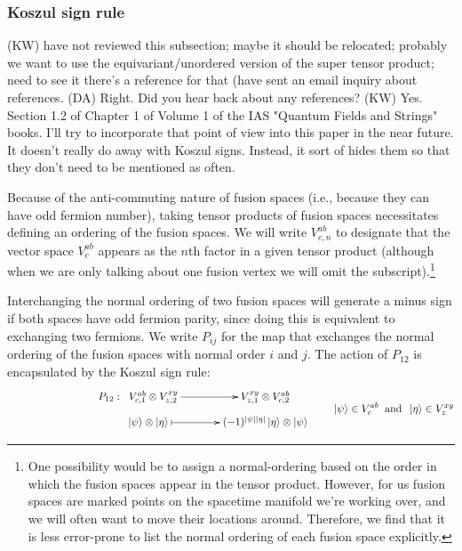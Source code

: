 \documentclass[12pt,a4paper]{article}
\newcommand{\tp}{\otimes}
\newcommand{\ket}[1]{\ensuremath{\left|#1\right\rangle}}
\newcommand{\dave}[1]{{\color{ao(english)}\footnotesize{(DA) #1}}}
\newcommand{\kw}[1]{{\color{kwcolor}\footnotesize{(KW) #1}}}
\begin{document}
\subsubsection{Koszul sign rule} \label{koszul_signs}

\kw{have not reviewed this subsection; maybe it should be relocated; 
probably we want to use the equivariant/unordered version of the super tensor product; 
need to see it there's a reference for that (have sent an email inquiry about references.}
\dave{Right. Did you hear back about any references?}
\kw{Yes.  Section 1.2 of Chapter 1 of Volume 1 of the IAS "Quantum Fields and Strings" books.
I'll try to incorporate that point of view into this paper in the near future.
It doesn't really do away with Koszul signs.
Instead, it sort of hides them so that they don't need to be mentioned as often.}

Because of the anti-commuting nature of fusion spaces (i.e., because they can have odd fermion number), taking tensor products of fusion spaces necessitates defining an ordering 
of the fusion spaces. 
We will write $V^{ab}_{c,n}$ to designate that the vector space $V^{ab}_c$ appears as the $n$th factor in a given tensor product (although when we are only talking about one fusion vertex we will omit the subscript).\footnote{One 
possibility would be to assign a normal-ordering based on the order in which the fusion spaces appear in the tensor product. 
However, for us fusion spaces are marked points on the spacetime manifold we're working over, and we will often want to move their locations around. 
Therefore, we find that it is less error-prone to list the normal ordering of each fusion space explicitly.}

Interchanging the normal ordering of two fusion spaces will generate a minus sign if both spaces have odd fermion parity, since doing this is equivalent to exchanging two fermions. 
We write $P_{ij}$ for the map that exchanges the normal ordering of the fusion spaces with normal order $i$ and $j$. 
The action of $P_{12}$ is encapsulated by the Koszul sign rule:
\begin{align}
\vcenter{\xymatrix @!0 @M=1mm @C=42mm{
 &P_{12}: \; \;V^{ab}_{c,1} \tp V^{xy}_{z,2} \ar[r]            &  V^{xy}_{z,1} \tp V^{ab}_{c,2} \\
		  &\;\;\;\;\;\;\; \ket{\psi}\tp\ket{\eta}  \ar@{|->}[r] & (-1)^{|\psi| |\eta|} \ket{\eta} \tp \ket{\psi}
	}} \quad \quad \ket{\psi} \in V^{ab}_{c} \;\; \text{and} \;\;  \ket{\eta} \in V^{xy}_{z}
\end{align}
\end{document}
